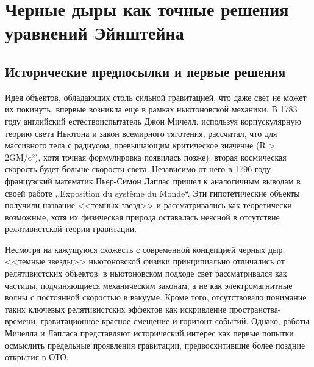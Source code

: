 \section{Черные дыры как точные решения уравнений Эйнштейна}\label{sec:1.1}
\subsection{Исторические предпосылки и первые решения}\label{sub:1.1.1}
Идея объектов, обладающих столь сильной гравитацией, что даже свет не может их покинуть, впервые возникла еще в рамках ньютоновской механики. В 1783 году английский естествоиспытатель Джон Мичелл, используя корпускулярную теорию света Ньютона и закон всемирного тяготения, рассчитал, что для массивного тела с радиусом, превышающим критическое значение (R > 2GM/c²), хотя точная формулировка появилась позже), вторая космическая скорость будет больше скорости света. Независимо от него в 1796 году французский математик Пьер-Симон Лаплас пришел к аналогичным выводам в своей работе ,,Exposition du système du Monde``. Эти гипотетические объекты получили название <<темных звезд>> и рассматривались как теоретически возможные, хотя их физическая природа оставалась неясной в отсутствие релятивистской теории гравитации.

Несмотря на кажущуюся схожесть с современной концепцией черных дыр, <<темные звезды>>  ньютоновской физики принципиально отличались от релятивистских объектов: в ньютоновском подходе свет рассматривался как частицы, подчиняющиеся механическим законам, а не как электромагнитные волны с постоянной скоростью в вакууме. Кроме того, отсутствовало понимание таких ключевых релятивистских эффектов как искривление пространства-времени, гравитационное красное смещение и горизонт событий. Однако, работы Мичелла и Лапласа представляют исторический интерес как первые попытки осмыслить предельные проявления гравитации, предвосхитившие более поздние открытия в ОТО.

